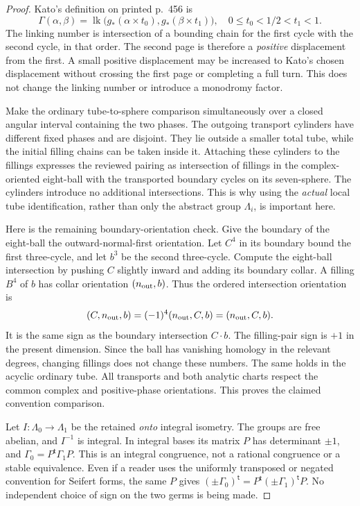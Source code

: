 \documentclass[11pt]{article}
\newcommand{\lk}{\operatorname{lk}}
\begin{document}
\begin{proof}
Kato's definition on printed p.~456 is
\[
\Gamma(\alpha,\beta)
 =\lk\bigl(g_*(\alpha\times t_0),g_*(\beta\times t_1)\bigr),
\quad 0\leq t_0<1/2<t_1<1.
\]
The linking number is intersection of a bounding chain for the
first cycle with the second cycle, in that order.
The second page is therefore a \emph{positive} displacement from
the first. A small positive displacement may be increased to
Kato's chosen displacement without crossing the first page or
completing a full turn. This does not change the linking number
or introduce a monodromy factor.

Make the ordinary tube-to-sphere comparison simultaneously over a
closed angular interval containing the two phases. The outgoing
transport cylinders have different fixed phases and are disjoint.
They lie outside a smaller total tube, while the initial filling
chains can be taken inside it. Attaching these cylinders to the
fillings expresses the reviewed pairing as intersection of fillings
in the complex-oriented eight-ball with the transported boundary
cycles on its seven-sphere. The cylinders introduce no additional
intersections. This is why using the \emph{actual} local tube
identification, rather than only the abstract group \(\Lambda_i\),
is important here.

Here is the remaining boundary-orientation check. Give the boundary
of the eight-ball the outward-normal-first orientation. Let
\(C^4\) in its boundary bound the first three-cycle, and let \(b^3\)
be the second three-cycle. Compute the eight-ball intersection by
pushing \(C\) slightly inward and adding its boundary collar.
A filling \(B^4\) of \(b\) has collar orientation
\((n_{\rm out},b)\). Thus the ordered intersection orientation is
\[
(C,n_{\rm out},b)=(-1)^4(n_{\rm out},C,b)
                 =(n_{\rm out},C,b).
\]
It is the same sign as the boundary intersection \(C\cdot b\).
The filling-pair sign is \(+1\) in the present dimension. Since the
ball has vanishing homology in the relevant degrees, changing
fillings does not change these numbers. The same holds in the
acyclic ordinary tube. All transports and both analytic charts
respect the common complex and positive-phase orientations.
This proves the claimed convention comparison.

Let \(I:\Lambda_0\to\Lambda_1\) be the retained \emph{onto} integral
isometry. The groups are free abelian, and \(I^{-1}\) is integral.
In integral bases its matrix \(P\) has determinant \(\pm1\), and
\(\Gamma_0=P^{\mathsf t}\Gamma_1P\). This is an integral congruence,
not a rational congruence or a stable equivalence.
Even if a reader uses the uniformly transposed or negated convention
for Seifert forms, the same \(P\) gives
\((\pm\Gamma_0)^{\mathsf t}
 =P^{\mathsf t}(\pm\Gamma_1)^{\mathsf t}P\).
No independent choice of sign on the two germs is being made.
\end{proof}
\end{document}
